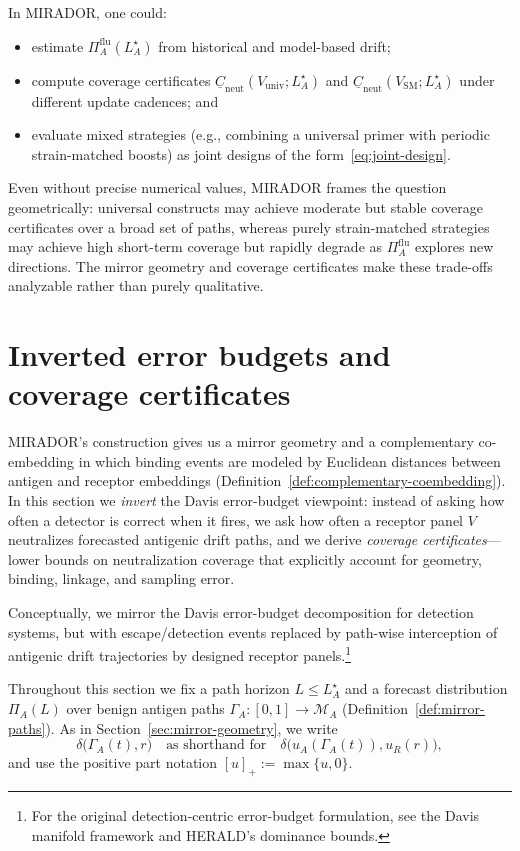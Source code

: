 \documentclass[11pt]{article}
\begin{document}
In MIRADOR, one could:
\begin{itemize}
  \item estimate $\Pi_A^{\mathrm{flu}}(L_A^\star)$ from historical and model-based drift;
  \item compute coverage certificates
        $\underline{C}_{\mathrm{neut}}(V_{\mathrm{univ}};L_A^\star)$ and
        $\underline{C}_{\mathrm{neut}}(V_{\mathrm{SM}};L_A^\star)$ under different update cadences; and
  \item evaluate mixed strategies (e.g., combining a universal primer with periodic strain-matched
        boosts) as joint designs of the form~\eqref{eq:joint-design}.
\end{itemize}
Even without precise numerical values, MIRADOR frames the question geometrically: universal
constructs may achieve moderate but stable coverage certificates over a broad set of paths, whereas
purely strain-matched strategies may achieve high short-term coverage but rapidly degrade as
$\Pi_A^{\mathrm{flu}}$ explores new directions. The mirror geometry and coverage certificates make
these trade-offs analyzable rather than purely qualitative.


\section{Inverted error budgets and coverage certificates}
\label{sec:inverted-error-budgets}

MIRADOR's construction gives us a mirror geometry and a complementary co-embedding in which
binding events are modeled by Euclidean distances between antigen and receptor embeddings
(Definition~\ref{def:complementary-coembedding}). In this section we \emph{invert} the Davis
error-budget viewpoint: instead of asking how often a detector is correct when it fires, we ask
how often a receptor panel $V$ neutralizes forecasted antigenic drift paths, and we derive
\emph{coverage certificates}---lower bounds on neutralization coverage that explicitly account for
geometry, binding, linkage, and sampling error.

Conceptually, we mirror the Davis error-budget decomposition for detection systems, but with
escape/detection events replaced by path-wise interception of antigenic drift trajectories by
designed receptor panels.\footnote{For the original detection-centric error-budget formulation,
see the Davis manifold framework and HERALD's dominance bounds.}

Throughout this section we fix a path horizon $L \le L_A^\star$ and a forecast distribution
$\Pi_A(L)$ over benign antigen paths $\Gamma_A : [0,1] \to \mathcal{M}_A$ (Definition~\ref{def:mirror-paths}).
As in Section~\ref{sec:mirror-geometry}, we write
\[
\delta\bigl(\Gamma_A(t),r\bigr)
\quad\text{as shorthand for}\quad
\delta\bigl(u_A(\Gamma_A(t)),u_R(r)\bigr),
\]
and use the positive part notation $[u]_+ := \max\{u,0\}$.
\end{document}
